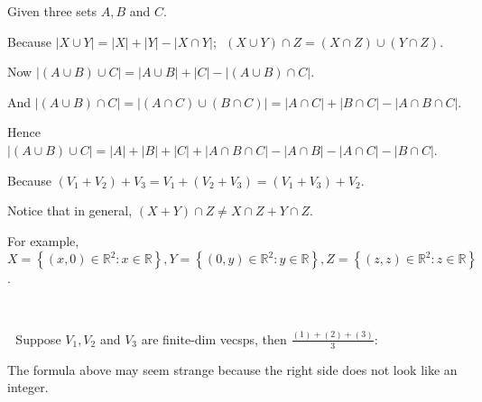 \documentclass[a4paper, 11pt, UTF8]{article}
\newcommand{\Largesl}[1]{{\Large\tgsl#1}}
\def\Rbb{{\mathbb{R}}}
\def\BulletPoint{{\small\bullet}}
\begin{document}
\begin{large}
\par{}\; Given three sets $A,B$ and $C$.\par\quad
Because $\left|X\cup Y\right|=\left|X\right|+\left|Y\right|-\left|X\cap Y\right|;\,\,\,(X\cup Y)\cap Z=(X\cap Z)\cup(Y\cap Z)$.\par\quad
Now $\left|(A\cup B)\cup C\right|=\left|A\cup B\right|+\left|C\right|-\left|(A\cup B)\cap C\right|.$\par\quad
And $\left|(A\cup B)\cap C\right|=\left|(A\cap C)\cup(B\cap C)\right|=\left|A\cap C\right|+\left|B\cap C\right|-\left|A\cap B\cap C\right|.$\par\quad
Hence $\left|(A\cup B)\cup C\right|=\left| A\right|+\left|B\right|+\left|C\right|+\left|A\cap B\cap C\right|-\left| A\cap B\right|-\left| A\cap C\right|-\left| B\cap C\right|.$\par\vspace{12pt}\quad
Because $(V_1+V_2)+V_3=V_1+(V_2+V_3)=(V_1+V_3)+V_2$.\par\quad
{}\par\quad
Notice that in general, $(X+Y)\cap Z\neq X\cap Z+Y\cap Z$.\par\quad
For example, $X=\left\{(x,0)\in\Rbb^2:x\in\Rbb\right\},Y=\left\{(0,y)\in\Rbb^2:y\in\Rbb\right\},Z=\left\{(z,z)\in\Rbb^2:z\in\Rbb\right\}$.\par
{\,}\par
\BulletPoint \,\Corollary \,\,\,\Largesl{Suppose $V_1,V_2$ and $V_3$ are finite-dim vecsps, then} {\small $\displaystyle\frac{(1)+(2)+(3)}{3}:$
}\par
{}\par\quad
{\tgsl The formula above may seem strange because the right side does not look like an integer.\PfEnd}\par
\SepLine[8pt]


\end{large}
\end{document}
